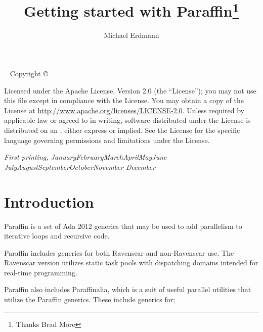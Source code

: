 \documentclass[justified]{tufte-book}
\title{Getting started with Paraffin\thanks{Thanks Brad More }}
\author[Michael Erdmann]{Michael Erdmann}
\newcommand{\monthyear}{%
  \ifcase\month\or January\or February\or March\or April\or May\or June\or
  July\or August\or September\or October\or November\or
  December\fi\space\number\year
}
\numberwithin{equation}{subsection}
\begin{document}
\frontmatter


\maketitle


\newpage
\begin{fullwidth}
~\vfill
\thispagestyle{empty}
\setlength{\parindent}{0pt}
\setlength{\parskip}{\baselineskip}
Copyright \copyright\ \the\year\ \thanklessauthor

\par{}

\par{}

\par Licensed under the Apache License, Version 2.0 (the ``License''); you may not
use this file except in compliance with the License. You may obtain a copy
of the License at \url{http://www.apache.org/licenses/LICENSE-2.0}. Unless
required by applicable law or agreed to in writing, software distributed
under the License is distributed on an , either express or implied. See the
License for the specific language governing permissions and limitations
under the License.

\par\textit{First printing, \monthyear}
\end{fullwidth}

\tableofcontents


\mainmatter


\chapter{Introduction}
\label{ch:introduction}
Paraffin is a set of Ada 2012 generics that may be used to add
parallelism to iterative loops and recursive code.

Paraffin includes generics for both Ravenscar and non-Ravenscar use.
The Ravenscar version utilizes static task pools with dispatching
domains intended for real-time programming.

Paraffin also includes Paraffinalia, which is a suit of useful parallel
utilities that utilize the Paraffin generics. These include generics for;
\end{document}
